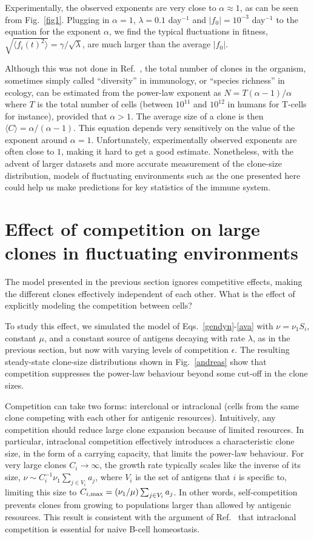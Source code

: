 \documentclass[aps,pre,twocolumn,superscriptaddress,groupedaddress]{revtex4}
\newcommand{\<}{\langle}
\renewcommand{\>}{\rangle}
\begin{document}
Experimentally, the observed exponents are very close to $\alpha\approx 1$, as can be seen from Fig.~\ref{fig1}. Plugging in $\alpha=1$, $\lambda=0.1$ {\rm day}$^{-1}$ and $|f_0|=10^{-3}$ {\rm day}$^{-1}$ to the equation for the exponent $\alpha$, we find the typical fluctuations in fitness, $\sqrt{\<f_i(t)^2\>}=\gamma/\sqrt{\lambda}$, are much larger than the average $|f_0|$.

Although this was not done in Ref.~\cite{desponds2016}, the total number of clones in the organism, sometimes simply called ``diversity'' in immunology, or ``species richness'' in ecology, can be estimated from the power-law exponent as $N = T (\alpha-1)/\alpha$ where $T$ is the total number of cells (between $10^{11}$ and $10^{12}$ in humans for T-cells for instance), provided that $\alpha>1$. The average size of a clone is then
$\langle C \rangle = {\alpha}/{(\alpha-1)}$.
This equation depends very sensitively on the value of the exponent around $\alpha=1$. Unfortunately, experimentally observed exponents are often close to $1$, making it hard to get a good estimate. Nonetheless, with the advent of larger datasets and more accurate measurement of the clone-size distribution,
models of fluctuating environments such as the one presented here could help us make predictions for key statistics of the immune system.
 
 \section{Effect of competition on large clones in fluctuating environments}
 The model presented in the previous section ignores competitive effects, making the different clones effectively independent of each other.
What is the effect of explicitly modeling the competition between cells? 

To study this effect, we simulated the model of Eqs.~\ref{gendyn}-\ref{ava} with $\nu=\nu_1S_i$, constant $\mu$, and a constant source of antigens decaying with rate $\lambda$, as in the previous section, but now with varying levels of competition $\epsilon$.
The resulting steady-state clone-size distributions shown in Fig.~\ref{andreas} show that competition suppresses the power-law behaviour beyond some cut-off in the clone sizes.

Competition can take two forms: interclonal or intraclonal (cells from the same clone competing with each other for antigenic resources). Intuitively, any competition should reduce large clone expansion because of limited resources. 
In particular, intraclonal competition effectively introduces a characteristic clone size, in the form of a carrying capacity, that limits the power-law behaviour. For very large clones $C_i\to\infty$, the growth rate typically scales like the inverse of its size, $\nu\sim C_i^{-1}\nu_1 \sum_{j\in V_i} a_j$, where $V_i$ is the set of antigens that $i$ is specific to,
limiting this size to $C_{i,\rm max}=(\nu_1/\mu)\sum_{j\in V_i} a_j$.
In other words, self-competition prevents clones from growing to populations larger than allowed by antigenic resources.
This result is consistent with the argument of Ref.~\cite{DeBoer2001} that intraclonal competition is essential for naive B-cell homeostasis.
\end{document}
